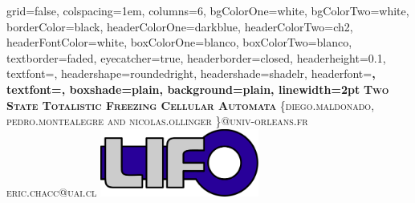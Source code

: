 \documentclass[portrait,final,a0paper,fontscale=0.277]{baposter}
\begin{document}


\begin{poster}%
  {
  grid=false,
  colspacing=1em,
  columns=6,
  bgColorOne=white,
  bgColorTwo=white,
  borderColor=black,
  headerColorOne=darkblue,
  headerColorTwo=ch2,
  headerFontColor=white,
  boxColorOne=blanco,
  boxColorTwo=blanco,
  textborder=faded,
  eyecatcher=true,
  headerborder=closed,
  headerheight=0.1\textheight,
  textfont=\sc,%
  headershape=roundedright,
  headershade=shadelr,
  headerfont=\Large\bf\textsc, %
  textfont={\setlength{\parindent}{1.5em}},
  boxshade=plain,
  background=plain,
  linewidth=2pt
  }
  {} 
  {\bf\textsc{Two State Totalistic Freezing Cellular Automata}\vspace{0.5em}}
  {\textsc{\small \{diego.maldonado, pedro.montealegre and nicolas.ollinger \}@univ-orleans.fr\\ eric.chacc@uai.cl}}
  {%
    \includegraphics[height=6em]{img/lifo}
  }

    \newcommand{\colouredcircle}{%
      \tikz{\useasboundingbox (-0.2em,-0.32em) rectangle(0.2em,0.32em); \draw[draw=black,fill=lightblue,line width=0.03em] (0,0) circle(0.18em);}}


\end{poster}
\end{document}
